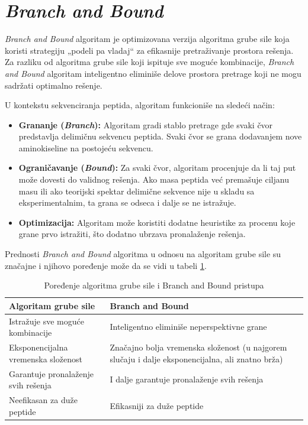 \documentclass[12pt,oneside]{memoir}
\begin{document}
\section{\emph{Branch and Bound}}
\emph{Branch and Bound} algoritam \cite{online_lecture, online_book} je optimizovana verzija algoritma grube sile koja koristi strategiju „podeli pa vladaj“ za efikasnije pretraživanje prostora rešenja. Za razliku od algoritma grube sile koji ispituje sve moguće kombinacije, \emph{Branch and Bound} algoritam inteligentno eliminiše delove prostora pretrage koji ne mogu sadržati optimalno rešenje.

U kontekstu sekvenciranja peptida, algoritam funkcioniše na sledeći način:
\begin{itemize}
    \item \textbf{Grananje (\emph{Branch}):} Algoritam gradi stablo pretrage gde svaki čvor predstavlja delimičnu sekvencu peptida. Svaki čvor se grana dodavanjem nove aminokiseline na postojeću sekvencu.
    \item \textbf{Ograničavanje (\emph{Bound}):} Za svaki čvor, algoritam procenjuje da li taj put može dovesti do validnog rešenja. Ako masa peptida već premašuje ciljanu masu ili ako teorijski spektar delimične sekvence nije u skladu sa eksperimentalnim, ta grana se odseca i dalje se ne istražuje.
    \item \textbf{Optimizacija:} Algoritam može koristiti dodatne heuristike za procenu koje grane prvo istražiti, što dodatno ubrzava pronalaženje rešenja.
\end{itemize}

Prednosti \emph{Branch and Bound} algoritma u odnosu na algoritam grube sile su značajne i njihovo poređenje može da se vidi u tabeli \ref{tab:branch_vs_brute}.

\begin{table}[H]
\centering
\renewcommand{\arraystretch}{1.5}
\begin{tabular}{|>{\raggedright\arraybackslash}m{}|>{\raggedright\arraybackslash}m{}|}
\hline
\textbf{Algoritam grube sile} & \textbf{Branch and Bound} \\
\hline
Istražuje sve moguće kombinacije & Inteligentno eliminiše neperspektivne grane \\
\hline
Eksponencijalna vremenska složenost & Značajno bolja vremenska složenost (u najgorem slučaju i dalje eksponencijalna, ali znatno brža) \\
\hline
Garantuje pronalaženje svih rešenja & I dalje garantuje pronalaženje svih rešenja \\
\hline
Neefikasan za duže peptide & Efikasniji za duže peptide \\
\hline
\end{tabular}
\caption{Poređenje algoritma grube sile i Branch and Bound pristupa}
\label{tab:branch_vs_brute}
\end{table}
\end{document}
